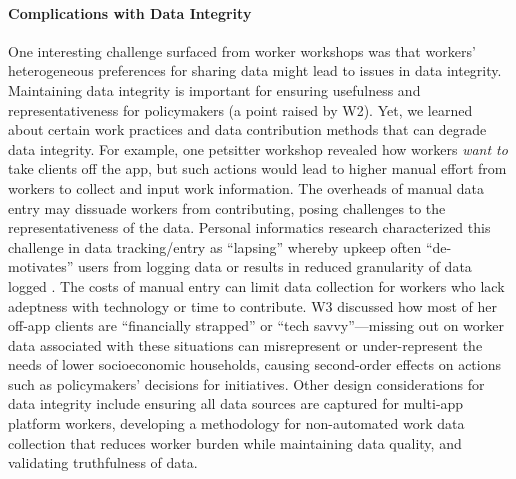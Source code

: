 \paragraph{Complications with Data Integrity}
{One interesting challenge surfaced from worker workshops was that workers' heterogeneous preferences for sharing data might lead to issues in data integrity.} Maintaining data integrity is important for ensuring usefulness and representativeness for policymakers (a point raised by W2). Yet, {we learned about} certain work practices {and data contribution methods that} can degrade data integrity. For example, one petsitter workshop revealed how workers \textit{want to} take clients off the app, but such actions would lead to higher manual effort from workers to collect and input work information. The overheads of manual data entry may {dissuade workers from contributing}, posing challenges to the representativeness of the data. 
Personal informatics research characterized this challenge in data tracking/entry as ``lapsing'' \cite{epstein2015lived} whereby upkeep often ``de-motivates'' users from logging data or results in reduced granularity of data logged \cite{epstein2015lived, li2010stage, choe2014understanding}. 
The costs of manual entry can limit data collection for workers who lack adeptness with technology or time to contribute. W3 discussed how most of her off-app clients are ``financially strapped'' or ``tech savvy''---missing out on worker data associated with these situations can misrepresent or under-represent the needs of lower socioeconomic households, causing second-order effects on actions such as policymakers' decisions for initiatives.
Other design considerations for data integrity include ensuring all data sources are captured for multi-app platform workers, developing a methodology for non-automated work data collection that reduces worker burden while maintaining data quality, and validating truthfulness of data.

